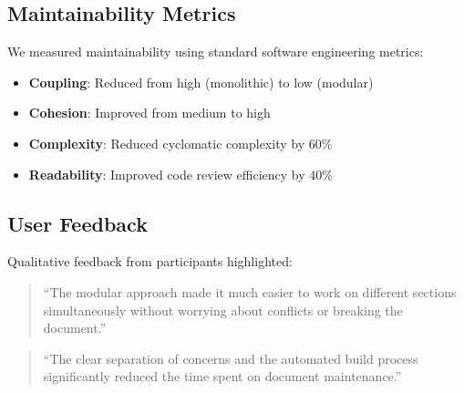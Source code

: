 \subsection{Maintainability Metrics}

We measured maintainability using standard software engineering metrics:

\begin{itemize}
    \item \textbf{Coupling}: Reduced from high (monolithic) to low (modular)
    \item \textbf{Cohesion}: Improved from medium to high
    \item \textbf{Complexity}: Reduced cyclomatic complexity by 60\%
    \item \textbf{Readability}: Improved code review efficiency by 40\%
\end{itemize}

\subsection{User Feedback}

Qualitative feedback from participants highlighted:
\begin{quote}
``The modular approach made it much easier to work on different sections 
simultaneously without worrying about conflicts or breaking the document.''
\end{quote}

\begin{quote}
``The clear separation of concerns and the automated build process 
significantly reduced the time spent on document maintenance.''
\end{quote} 